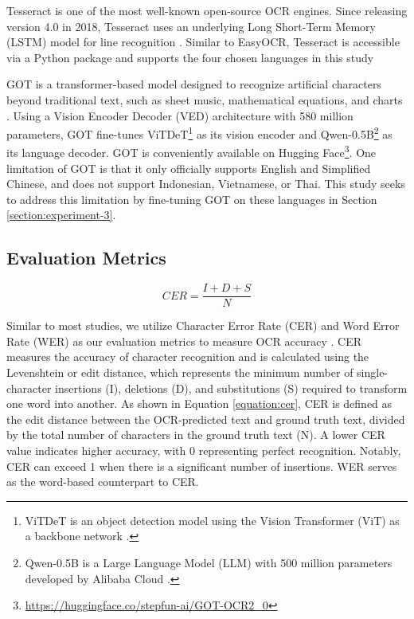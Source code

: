 \documentclass[12pt,oneside]{memoir}
\begin{document}
Tesseract is one of the most well-known open-source OCR engines. Since releasing version 4.0 in 2018, Tesseract uses an underlying Long Short-Term Memory (LSTM) model for line recognition \parencite{tesseract-2025}.
Similar to EasyOCR, Tesseract is accessible via a Python package and supports the four chosen languages in this study 

GOT is a transformer-based model designed to recognize artificial characters beyond traditional text, such as sheet music, mathematical equations, and charts \parencite{wei-etal-2024}. 
Using a Vision Encoder Decoder (VED) architecture with 580 million parameters, GOT fine-tunes ViTDeT\footnote{ViTDeT is an object detection model using the Vision Transformer (ViT) as a backbone network \parencite{li-etal-2022}.} as its vision encoder and Qwen-0.5B\footnote{Qwen-0.5B is a Large Language Model (LLM) with 500 million parameters developed by Alibaba Cloud \parencite{qwen-2025}.} as its language decoder. 
GOT is conveniently available on Hugging Face\footnote{\url{https://huggingface.co/stepfun-ai/GOT-OCR2_0}}.
One limitation of GOT is that it only officially supports English and Simplified Chinese, and does not support Indonesian, Vietnamese, or Thai. 
This study seeks to address this limitation by fine-tuning GOT on these languages in Section \ref{section:experiment-3}.

\subsection{Evaluation Metrics}

\begin{equation}
    CER = \frac{I + D + S}{N}
    \label{equation:cer}
\end{equation}

Similar to most studies, we utilize Character Error Rate (CER) and Word Error Rate (WER) as our evaluation metrics to measure OCR accuracy \parencite{hegghammer-2022, ignat-etal-2022}. 
CER measures the accuracy of character recognition and is calculated using the Levenshtein or edit distance, which represents the minimum number of single-character insertions (I), deletions (D), and substitutions (S) required to transform one word into another. 
As shown in Equation \ref{equation:cer}, CER is defined as the edit distance between the OCR-predicted text and ground truth text, divided by the total number of characters in the ground truth text (N). 
A lower CER value indicates higher accuracy, with 0 representing perfect recognition. 
Notably, CER can exceed 1 when there is a significant number of insertions. 
WER serves as the word-based counterpart to CER.
\end{document}
